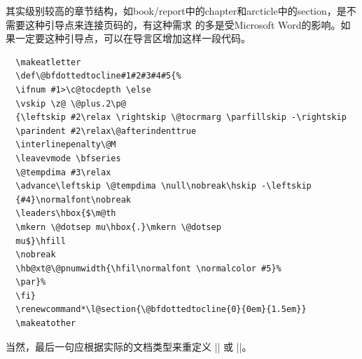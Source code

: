 其实级别较高的章节结构，如book/report中的chapter和arcticle中的section，是不需要这种引导点来连接页码的，有这种需求
的多是受Microsoft Word的影响。如果一定要这种引导点，可以在导言区增加这样一段代码。
\begin{verbatim}
  \makeatletter
  \def\@bfdottedtocline#1#2#3#4#5{%
  \ifnum #1>\c@tocdepth \else
  \vskip \z@ \@plus.2\p@
  {\leftskip #2\relax \rightskip \@tocrmarg \parfillskip -\rightskip
  \parindent #2\relax\@afterindenttrue
  \interlinepenalty\@M
  \leavevmode \bfseries
  \@tempdima #3\relax
  \advance\leftskip \@tempdima \null\nobreak\hskip -\leftskip
  {#4}\normalfont\nobreak
  \leaders\hbox{$\m@th
  \mkern \@dotsep mu\hbox{.}\mkern \@dotsep
  mu$}\hfill
  \nobreak
  \hb@xt@\@pnumwidth{\hfil\normalfont \normalcolor #5}%
  \par}%
  \fi}
  \renewcommand*\l@section{\@bfdottedtocline{0}{0em}{1.5em}}
  \makeatother
\end{verbatim}
当然，最后一句应根据实际的文档类型来重定义 |\l@chapter| 或 |\l@section|。


